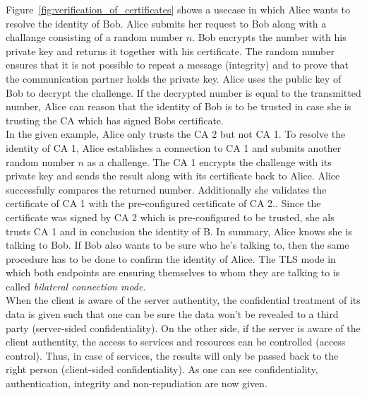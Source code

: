 Figure~\ref{fig:verification_of_certificates} shows a usecase in which Alice wants to resolve the identity of Bob.
Alice submits her request to Bob along with a challange consisting of a random number $n$. 
Bob encrypts the number with his private key and returns it together with his certificate.
The random number ensures that it is not possible to repeat a message (integrity) and to prove that the communication partner holds the private key.
Alice uses the public key of Bob to decrypt the challenge. 
If the decrypted number is equal to the transmitted number, Alice can reason that the identity of Bob is to be trusted in case she is trusting the CA which has signed Bobs certificate.\\

In the given example, Alice only trusts the CA 2 but not CA 1.
To resolve the identity of CA 1, Alice establishes a connection to CA 1 and submits another random number $n$ as a challenge.
The CA 1 encrypts the challenge with its private key and sends the result along with its certificate back to Alice.
Alice successfully compares the returned number. Additionally she validates the certificate of CA 1 with the pre-configured certificate of CA 2..
Since the certificate was signed by CA 2 which is pre-configured to be trusted, she als trusts CA 1 and in conclusion the identity of B.
In summary, Alice knows she is talking to Bob.
If Bob also wants to be sure who he's talking to, then the same procedure has to be done to confirm the identity of Alice.
The TLS mode in which both endpoints are ensuring themselves to whom they are talking to is called \textit{bilateral connection mode}.\\


When the client is aware of the server authentity, the confidential treatment of its data is given such that one can be sure the data won't be revealed to a third party (server-sided confidentiality). 
On the other side, if the server is aware of the client authentity, the access to services and resources can be controlled (access control). Thus, in case of services, the results will only be passed back to the right person (client-sided confidentiality). 
As one can see confidentiality, authentication, integrity and non-repudiation are now given.\\


